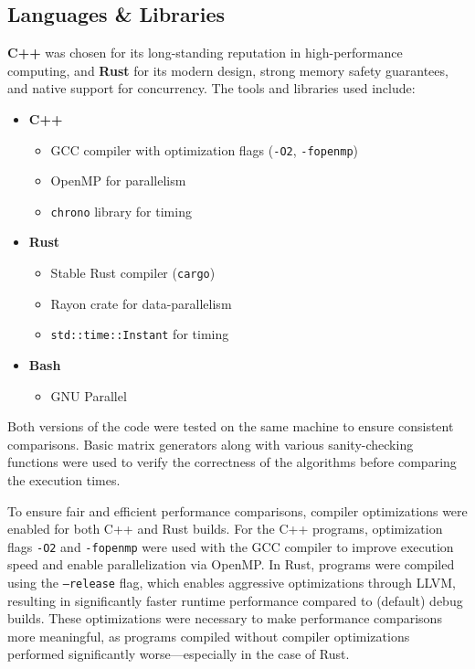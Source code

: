 \documentclass[12pt]{article}
\begin{document}
\subsection{Languages \& Libraries}

\textbf{C++} was chosen for its long-standing reputation in high-performance computing, and \textbf{Rust} for its modern design, strong memory safety guarantees,
and native support for concurrency. The tools and libraries used include:

\begin{itemize}
    \item \textbf{C++}
          \begin{itemize}
              \item GCC compiler with optimization flags (\texttt{-O2}, \texttt{-fopenmp})
              \item OpenMP for parallelism
              \item \texttt{chrono} library for timing
          \end{itemize}

    \item \textbf{Rust}
          \begin{itemize}
              \item Stable Rust compiler (\texttt{cargo})
              \item Rayon crate for data-parallelism
              \item \texttt{std::time::Instant} for timing
          \end{itemize}
    \item \textbf{Bash}
          \begin{itemize}
              \item GNU Parallel
          \end{itemize}
\end{itemize}

Both versions of the code were tested on the same machine to ensure consistent comparisons. Basic matrix generators along with various
sanity-checking functions were used to verify the correctness of the algorithms before comparing the execution times.

To ensure fair and efficient performance comparisons, compiler optimizations were enabled for both C++ and Rust builds. For the C++ programs,
optimization flags  \texttt{-O2} and \texttt{-fopenmp} were used with the GCC compiler to improve execution speed and enable parallelization via OpenMP.
In Rust, programs were compiled using the \texttt{--release} flag, which enables aggressive optimizations through LLVM, resulting in significantly faster
runtime performance compared to (default) debug builds. These optimizations were necessary to make performance comparisons more meaningful, as programs
compiled without compiler optimizations performed significantly worse—especially in the case of Rust.
\end{document}
